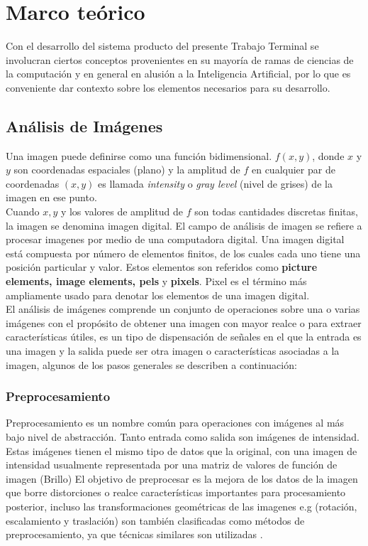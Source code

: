 \chapter{Marco teórico}
Con el desarrollo del sistema producto del presente Trabajo Terminal se involucran ciertos conceptos provenientes en su mayoría de ramas de ciencias de la computación y en general en alusión a la Inteligencia Artificial, por lo que es conveniente dar contexto sobre los elementos necesarios para su desarrollo.

\section{Análisis de Imágenes}\label{sec:imAnalysis}
		
		Una imagen puede definirse como una función bidimensional. $f(x,y)$, donde $x$ y $y$ son coordenadas espaciales (plano) y la amplitud de $f$ en cualquier par de coordenadas $(x,y)$ es llamada \textit{intensity} o \textit{gray level} (nivel de grises) de la imagen en ese punto.
		\\
		Cuando $x, y$ y los valores de amplitud de $f$ son todas cantidades discretas finitas, la imagen se denomina imagen digital. El campo de análisis de imagen se refiere a procesar imagenes por medio de una computadora digital. Una imagen digital está compuesta por número de elementos finitos, de los cuales cada uno tiene una posición particular y valor. Estos elementos son referidos como \textbf{picture elements, image elements, pels} y \textbf{pixels}. Pixel es el término más ampliamente usado para denotar los elementos de una imagen digital.
		\\
		
        El análisis de imágenes comprende un conjunto de operaciones sobre una o varias imágenes con el propósito de obtener una imagen con mayor realce o para extraer características útiles, es un tipo de dispensación de señales en el que la entrada es una imagen y la salida puede ser otra imagen o características asociadas a la imagen, algunos de los pasos generales se describen a continuación:
        
        \subsection{Preprocesamiento}
            Preprocesamiento es un nombre común para operaciones con imágenes al más bajo nivel de abstracción. Tanto entrada como salida son imágenes de intensidad. Estas imágenes tienen el mismo tipo de datos que la original, con una imagen de intensidad usualmente representada por una matriz de valores de función de imagen (Brillo) El objetivo de preprocesar es la mejora de los datos de la imagen que borre distorciones o realce características importantes para procesamiento posterior, incluso las transformaciones geométricas de las imagenes e.g (rotación, escalamiento y traslación) son también clasificadas como métodos de preprocesamiento, ya que técnicas similares son utilizadas \cite{imgAnalySeg}.
               

